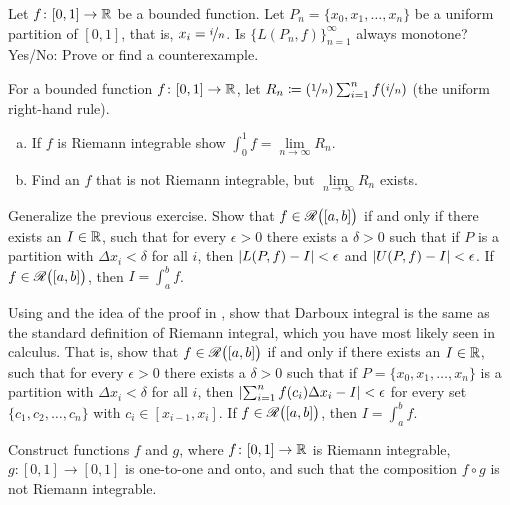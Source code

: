 \begin{exercise}
Let $f \colon [0,1] \to {\mathbb{R}}$ be a bounded function.
Let $P_n = \{ x_0,x_1,\ldots,x_n \}$ be a uniform partition of $[0,1]$,
that is, $x_i = \nicefrac{i}{n}$.  Is $\bigl\{ L(P_n,f) \bigr\}_{n=1}^\infty$
always monotone?  Yes/No: Prove or find a counterexample.
\end{exercise}

\begin{exercise}[Challenging]
For a bounded function $f \colon [0,1] \to {\mathbb{R}}$, let
$R_n \coloneqq (\nicefrac{1}{n})\sum_{i=1}^n f(\nicefrac{i}{n})$ (the
uniform right-hand rule).
\begin{enumerate}[a)]
\item
If $f$ is Riemann integrable show $\int_0^1 f = \lim\limits_{n\to\infty} R_n$.
\item
Find an $f$ that is not Riemann integrable, but $\lim\limits_{n\to\infty} R_n$ exists.
\end{enumerate}
\end{exercise}

\begin{exercise}[Challenging] \label{exercise:riemannintdarboux}
Generalize the previous exercise.
Show that $f \in {\mathscr{R}}\bigl([a,b]\bigr)$ if and only if there exists an $I \in {\mathbb{R}}$,
such that for every $\epsilon > 0$ there exists
a $\delta > 0$ such that if $P$ is a partition with $\Delta x_i < \delta$
for all $i$, then
$\left\lvert {L(P,f) - I} \right\rvert < \epsilon$ and
$\left\lvert {U(P,f) - I} \right\rvert < \epsilon$.  If $f \in {\mathscr{R}}\bigl([a,b]\bigr)$, then $I = \int_a^b f$.
\end{exercise}

\begin{exercise}
Using  and the idea of
the proof in , show that 
Darboux integral is the same as the standard definition
of Riemann integral, which you have most likely seen in calculus.  That is,
show that
$f \in {\mathscr{R}}\bigl([a,b]\bigr)$ if and only if there exists an $I \in {\mathbb{R}}$,
such that for every $\epsilon > 0$ there exists
a $\delta > 0$ such that if $P = \{ x_0,x_1,\ldots,x_n \}$
is a partition with $\Delta x_i < \delta$
for all $i$, then
$\left\lvert {\sum_{i=1}^n f(c_i) \Delta x_i - I} \right\rvert < \epsilon$ for every set
$\{ c_1,c_2,\ldots,c_n \}$ with $c_i \in [x_{i-1},x_i]$.
If $f \in {\mathscr{R}}\bigl([a,b]\bigr)$, then $I = \int_a^b f$.
\end{exercise}


\begin{exercise}[Challenging]
Construct functions $f$ and $g$, 
where
$f \colon [0,1] \to {\mathbb{R}}$ is Riemann integrable,
$g \colon [0,1] \to [0,1]$ is one-to-one and onto,
and such that the composition $f \circ g$ is not Riemann integrable.
\end{exercise}

